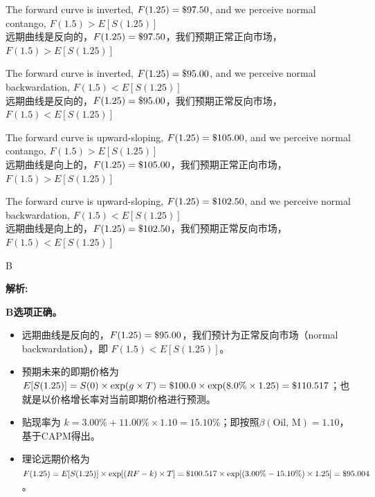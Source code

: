 \documentclass{article}
\newcommand{\dollar}{\ifmmode\text{\$}\else\$\fi}  %
\newenvironment{explanation}
{\textbf{解析:}\par}
{\par}
\begin{document}
\begin{choices}
    \item The forward curve is inverted, $F(1.25) = \dollar97.50$, and we perceive normal contango, $F(1.5)>E[S(1.25)]$
    \\远期曲线是反向的，$F(1.25) = \dollar97.50$，我们预期正常正向市场，$F(1.5)>E[S(1.25)]$
    \item The forward curve is inverted, $F(1.25) = \dollar95.00$, and we perceive normal backwardation, $F(1.5)<E[S(1.25)]$ 
    \\远期曲线是反向的，$F(1.25) = \dollar95.00$，我们预期正常反向市场，$F(1.5)<E[S(1.25)]$
    \item The forward curve is upward-sloping, $F(1.25) = \dollar105.00$, and we perceive normal contango, $F(1.5)>E[S(1.25)]$
    \\远期曲线是向上的，$F(1.25) = \dollar105.00$，我们预期正常正向市场，$F(1.5)>E[S(1.25)]$
    \item The forward curve is upward-sloping, $F(1.25) = \dollar102.50$, and we perceive normal backwardation, $F(1.5)<E[S(1.25)]$
    \\远期曲线是向上的，$F(1.25) = \dollar102.50$，我们预期正常反向市场，$F(1.5)<E[S(1.25)]$
\end{choices}

\begin{correctanswer}
    B
\end{correctanswer}

\begin{explanation}
    \textbf{B选项正确。} 
    \begin{itemize}
        \item 远期曲线是反向的，$F(1.25) = \dollar95.00$，我们预计为正常反向市场（normal backwardation），即 $F(1.5)<E[S(1.25)]$。
        \item 预期未来的即期价格为 $E[S(1.25)] = S(0)\times\exp(g\times T) = \dollar100.0\times\exp(8.0\%\times1.25) = \dollar110.517$；也就是以价格增长率对当前即期价格进行预测。
        \item 贴现率为 $k = 3.00\% + 11.00\%\times1.10 = 15.10\%$；即按照$ \beta(\text{Oil, M}) = 1.10 $，基于CAPM得出。
        \item 理论远期价格为 $F(1.25) = E[S(1.25)]\times\exp[(RF - k)\times T] = \dollar100.517\times\exp[(3.00\% - 15.10\%)\times1.25] = \dollar95.004$。
    \end{itemize}

\end{explanation}
\end{document}
